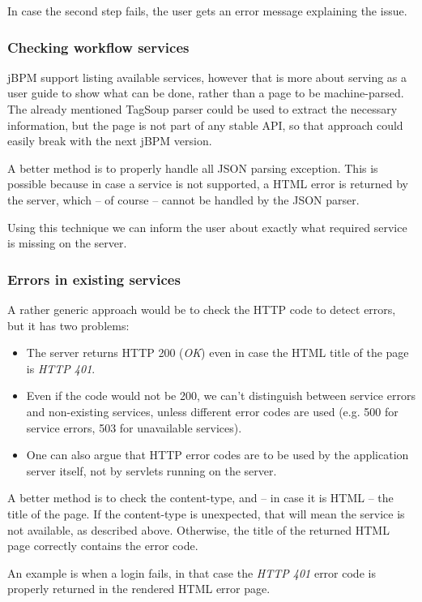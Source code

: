 In case the second step fails, the user gets an error message explaining the issue.

\subsubsection*{Checking workflow services}

jBPM support listing available services, however that is more about serving as
a user guide to show what can be done, rather than a page to be machine-parsed.
The already mentioned TagSoup parser could be used to extract the necessary
information, but the page is not part of any stable API, so that approach could
easily break with the next jBPM version.

A better method is to properly handle all JSON parsing exception. This is
possible because in case a service is not supported, a HTML error is returned
by the server, which -- of course -- cannot be handled by the JSON parser.

Using this technique we can inform the user about exactly what required service
is missing on the server.

\subsubsection*{Errors in existing services}

A rather generic approach would be to check the HTTP code to detect errors, but it has two problems:

\begin{itemize}
\item The server returns HTTP 200 (\emph{OK}) even in case the HTML title of the page is \emph{HTTP 401}.
\item Even if the code would not be 200, we can't distinguish between service errors and non-existing services, unless different error codes are used (e.g. 500 for service errors, 503 for unavailable services).
\item One can also argue that HTTP error codes are to be used by the application server itself, not by servlets running on the server.
\end{itemize}

A better method is to check the content-type, and -- in case it is HTML -- the
title of the page.  If the content-type is unexpected, that will mean the
service is not available, as described above. Otherwise, the title of the
returned HTML page correctly contains the error code.

An example is when a login fails, in that case the \emph{HTTP 401} error code
is properly returned in the rendered HTML error page.

